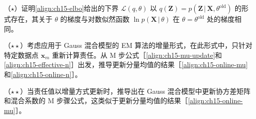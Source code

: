 \documentclass[../../main.tex]{subfiles}
\begin{document}
\begin{exercise}\label{exercise:ch15-22}
（$\star$）证明\eqref{align:ch15-elbo}给出的下界 $\mathcal{L}(q,\theta)$ 以 $q(\bm{Z})=p(\bm{Z}\,|\,\bm{X},\theta^{\text{old}})$ 的形式存在，其关于 $\theta$ 的梯度与对数似然函数 $\ln p(\bm{X}\,|\,\theta)$ 在 $\theta=\theta^{\text{old}}$ 处的梯度相同。
\end{exercise}

\begin{exercise}\label{exercise:ch15-23}
（$\star\star$）考虑应用于 Gauss 混合模型的 EM 算法的增量形式，在此形式中，只针对特定数据点 $\bm{x}_m$ 重新计算责任。从 M 步公式［\eqref{align:ch15-mu-update}和\eqref{align:ch15-effective-n}］出发，推导更新分量均值的结果［\eqref{align:ch15-online-mu}和\eqref{align:ch15-online-n}］。
\end{exercise}

\begin{exercise}\label{exercise:ch15-24}
（$\star\star$）当责任值以增量方式更新时，推导出在 Gauss 混合模型中更新协方差矩阵和混合系数的 M 步骤公式，这类似于更新分量均值的结果［\eqref{align:ch15-online-mu}］。
\end{exercise}
\end{document}
